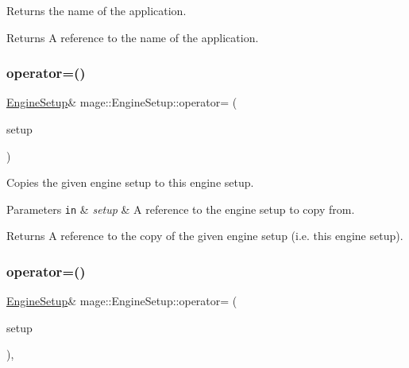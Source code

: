 Returns the name of the application.

\begin{DoxyReturn}{Returns}
A reference to the name of the application. 
\end{DoxyReturn}
\hypertarget{classmage_1_1_engine_setup_a4234ca6df84db6a2005b994ed42da11f}{}\label{classmage_1_1_engine_setup_a4234ca6df84db6a2005b994ed42da11f} 
\subsubsection{\texorpdfstring{operator=()}{operator=()}\hspace{0.1cm}{\footnotesize\ttfamily [1/2]}}
{\footnotesize\ttfamily \hyperlink{classmage_1_1_engine_setup}{Engine\+Setup}\& mage\+::\+Engine\+Setup\+::operator= (\begin{DoxyParamCaption}\item[{const \hyperlink{classmage_1_1_engine_setup}{Engine\+Setup} \&}]{setup }\end{DoxyParamCaption})\hspace{0.3cm}{\ttfamily [default]}}

Copies the given engine setup to this engine setup.


\begin{DoxyParams}[1]{Parameters}
\mbox{\tt in}  & {\em setup} & A reference to the engine setup to copy from. \\
\hline
\end{DoxyParams}
\begin{DoxyReturn}{Returns}
A reference to the copy of the given engine setup (i.\+e. this engine setup). 
\end{DoxyReturn}
\hypertarget{classmage_1_1_engine_setup_a4c2e71f96f138b28fd6ff1c088d05a53}{}\label{classmage_1_1_engine_setup_a4c2e71f96f138b28fd6ff1c088d05a53} 
\subsubsection{\texorpdfstring{operator=()}{operator=()}\hspace{0.1cm}{\footnotesize\ttfamily [2/2]}}
{\footnotesize\ttfamily \hyperlink{classmage_1_1_engine_setup}{Engine\+Setup}\& mage\+::\+Engine\+Setup\+::operator= (\begin{DoxyParamCaption}\item[{\hyperlink{classmage_1_1_engine_setup}{Engine\+Setup} \&\&}]{setup }\end{DoxyParamCaption})\hspace{0.3cm}{\ttfamily [default]}, {\ttfamily [noexcept]}}

